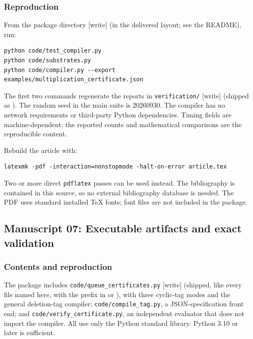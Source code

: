 \documentclass[11pt,a4paper]{article}
\theoremstyle{definition}
\theoremstyle{remark}
\newcommand{\kw}[1]{\texttt{#1}}
\newcommand{\wtag}{\textup{[write]}}%
\begin{document}
\subsubsection{Reproduction}

From the package directory \wtag{} (in the delivered layout; see the README), run:
\begin{lstlisting}
python code/test_compiler.py
python code/substrates.py
python code/compiler.py --export examples/multiplication_certificate.json
\end{lstlisting}
The first two commands regenerate the reports in \kw{verification/} \wtag{} (shipped as ). The
random seed in the main suite is $20260930$. The compiler has no network
requirements or third-party Python dependencies. Timing fields are
machine-dependent; the reported counts and mathematical comparisons are the
reproducible content.

Rebuild the article with:
\begin{lstlisting}
latexmk -pdf -interaction=nonstopmode -halt-on-error article.tex
\end{lstlisting}
Two or more direct \kw{pdflatex} passes can be used instead. The bibliography
is contained in this source, so no external bibliography database is needed.
The PDF uses standard installed TeX fonts; font files are not included in the
package.


\subsection{Manuscript 07: Executable artifacts and exact validation}\label{cdc:qc:sec:validation}
\subsubsection{Contents and reproduction}
The package includes \texttt{code/queue\_certificates.py} \wtag{} (shipped, like every file named here, with the prefix  in  or ), with three cyclic-tag modes and the general deletion-tag compiler; \texttt{code/compile\_tag.py}, a JSON-specification front end; and \texttt{code/verify\_certificate.py}, an independent evaluator that does not import the compiler. All use only the Python standard library. Python 3.10 or later is sufficient.
\end{document}
